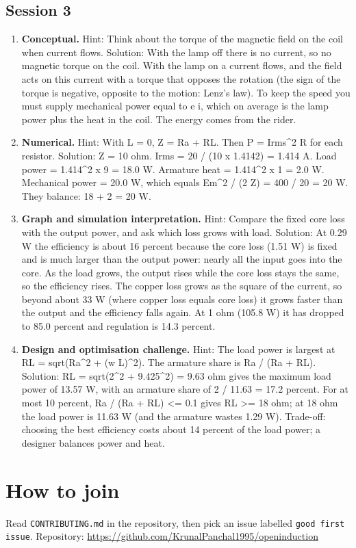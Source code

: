 \documentclass[11pt,a4paper]{article}
\begin{document}
\subsection*{Session 3}
\begin{enumerate}[nosep]
\item \textbf{Conceptual.} Hint: Think about the torque of the magnetic field on the coil when current flows. Solution: With the lamp off there is no current, so no magnetic torque on the coil. With the lamp on a current flows, and the field acts on this current with a torque that opposes the rotation (the sign of the torque is negative, opposite to the motion: Lenz's law). To keep the speed you must supply mechanical power equal to e i, which on average is the lamp power plus the heat in the coil. The energy comes from the rider.
\item \textbf{Numerical.} Hint: With L = 0, Z = Ra + RL. Then P = Irms\textasciicircum{}2 R for each resistor. Solution: Z = 10 ohm. Irms = 20 / (10 x 1.4142) = 1.414 A. Load power = 1.414\textasciicircum{}2 x 9 = 18.0 W. Armature heat = 1.414\textasciicircum{}2 x 1 = 2.0 W. Mechanical power = 20.0 W, which equals Em\textasciicircum{}2 / (2 Z) = 400 / 20 = 20 W. They balance: 18 + 2 = 20 W.
\item \textbf{Graph and simulation interpretation.} Hint: Compare the fixed core loss with the output power, and ask which loss grows with load. Solution: At 0.29 W the efficiency is about 16 percent because the core loss (1.51 W) is fixed and is much larger than the output power: nearly all the input goes into the core. As the load grows, the output rises while the core loss stays the same, so the efficiency rises. The copper loss grows as the square of the current, so beyond about 33 W (where copper loss equals core loss) it grows faster than the output and the efficiency falls again. At 1 ohm (105.8 W) it has dropped to 85.0 percent and regulation is 14.3 percent.
\item \textbf{Design and optimisation challenge.} Hint: The load power is largest at RL = sqrt(Ra\textasciicircum{}2 + (w L)\textasciicircum{}2). The armature share is Ra / (Ra + RL). Solution: RL = sqrt(2\textasciicircum{}2 + 9.425\textasciicircum{}2) = 9.63 ohm gives the maximum load power of 13.57 W, with an armature share of 2 / 11.63 = 17.2 percent. For at most 10 percent, Ra / (Ra + RL) \textless{}= 0.1 gives RL \textgreater{}= 18 ohm; at 18 ohm the load power is 11.63 W (and the armature wastes 1.29 W). Trade-off: choosing the best efficiency costs about 14 percent of the load power; a designer balances power and heat.
\end{enumerate}

\section{How to join}
Read \texttt{CONTRIBUTING.md} in the repository, then pick an issue labelled \texttt{good first issue}. Repository: \url{https://github.com/KrunalPanchal1995/openinduction}
\end{document}
